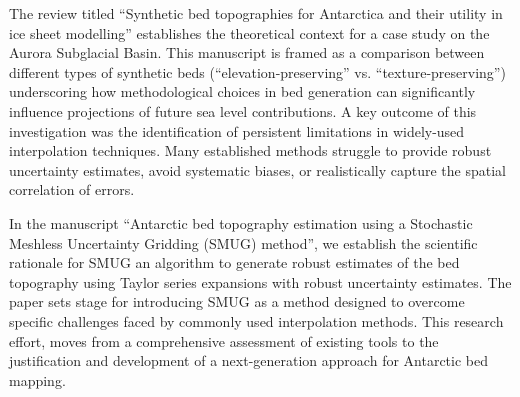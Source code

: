 The review titled ``Synthetic bed topographies for Antarctica and their utility in ice sheet modelling'' establishes the theoretical context for a case study on the Aurora Subglacial Basin. This manuscript is framed as a comparison between different types of synthetic beds (``elevation-preserving'' vs. ``texture-preserving'') underscoring how methodological choices in bed generation can significantly influence projections of future sea level contributions. A key outcome of this investigation was the identification of persistent limitations in widely-used interpolation techniques. Many established methods struggle to provide robust uncertainty estimates, avoid systematic biases, or realistically capture the spatial correlation of errors.

In the manuscript ``Antarctic bed topography estimation using a Stochastic Meshless Uncertainty Gridding (SMUG) method'', we establish the scientific rationale for SMUG an algorithm to generate robust estimates of the bed topography using Taylor series expansions with robust uncertainty estimates. The paper sets stage for introducing SMUG as a method designed to overcome specific challenges faced by commonly used interpolation methods. This research effort, moves from a comprehensive assessment of existing tools to the justification and development of a next-generation approach for Antarctic bed mapping.



